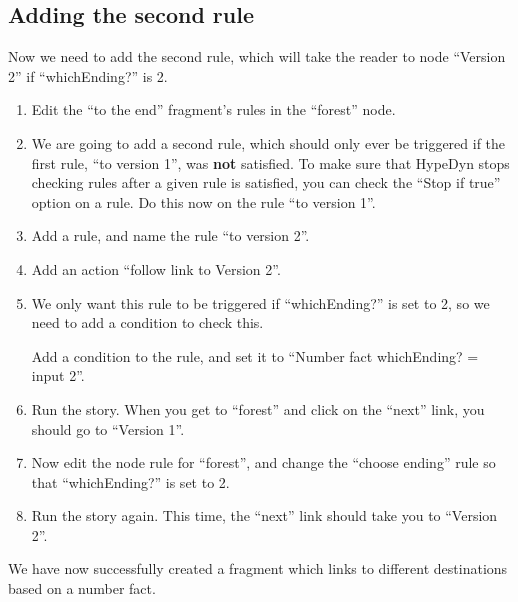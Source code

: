 \documentclass{article}
\begin{document}
\subsection{Adding the second rule}


Now we need to add the second rule, which will take the reader to 
node ``Version 2'' if ``whichEnding?'' is 2.

\begin{enumerate}
    \item Edit the ``to the end'' fragment's rules in the ``forest'' node.
    \item We are going to add a second rule, which should only ever be triggered if the first rule, ``to version 1'', was \textbf{not} satisfied. To make sure that HypeDyn stops checking rules after a given rule is satisfied, you can check the ``Stop if true'' option on a rule. Do this now on the rule ``to version 1''.
    \item Add a rule, and name the rule ``to version 2''.
    \item Add an action ``follow link to Version 2''.
    \item We only want this rule to be triggered if ``whichEnding?'' is set to 2, so we need to add a condition to check this. 

    
Add a condition to the rule, and set it to ``Number fact whichEnding? = input 2''.
    \item Run the story. When you get to ``forest'' and click on the ``next'' link, you should go to ``Version 1''.
    \item Now edit the node rule for ``forest'', and change the ``choose ending'' rule so that ``whichEnding?'' is set to 2.
    \item Run the story again. This time, the ``next'' link should take you to ``Version 2''.
\end{enumerate}

\noindent We have now successfully created a fragment which links to different destinations based on a number fact.

\end{document}
